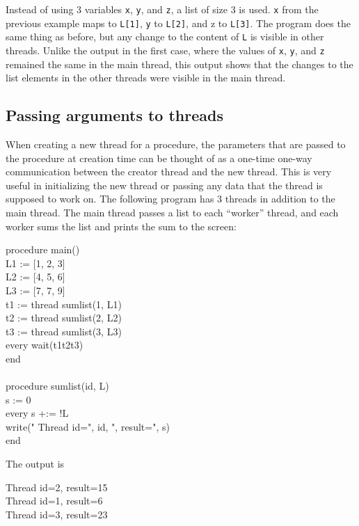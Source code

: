 \noindent
Instead of using 3 variables \texttt{x}, \texttt{y}, and \texttt{z}, a
list of size 3 is used. \texttt{x} from the previous example maps to
\texttt{L[1]}, \texttt{y} to \texttt{L[2]}, and z to
\texttt{L[3]}. The program does the same thing as before, but any
change to the content of \texttt{L} is visible in other
threads. Unlike the output in the first case, where the values of
\texttt{x}, \texttt{y}, and \texttt{z} remained the same in the main
thread, this output shows that the changes to the list elements in the
other threads were visible in the main thread.

\subsection*{Passing arguments to threads}

When creating a new thread for a procedure, the parameters that are
passed to the procedure at creation time can be thought of as a
one-time one-way communication between the creator thread and the new
thread. This is very useful in initializing the new thread or passing
any data that the thread is supposed to work on. The following program
has 3 threads in addition to the main thread. The main thread passes a
list to each ``worker'' thread, and each worker sums the list and
prints the sum to the screen:

\begin{icode}
procedure main() \\
\>   L1 := [1, 2, 3] \\
\>   L2 := [4, 5, 6] \\
\>   L3 := [7, 7, 9] \\
\>   t1 := thread sumlist(1, L1) \\
\>   t2 := thread sumlist(2, L2) \\
\>   t3 := thread sumlist(3, L3) \\
\>   every wait(t1{\textbar}t2{\textbar}t3) \\
end \\
\\
procedure sumlist(id, L) \\
\>   s := 0 \\
\>   every s +:= !L \\
\>   write(" Thread id=", id, ", result=", s) \\
end
\end{icode}
The output is
\begin{icode}
Thread id=2, result=15 \\
Thread id=1, result=6 \\
Thread id=3, result=23
\end{icode}


